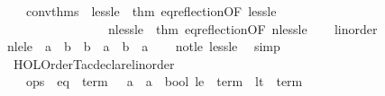 \begin{isabellebody}
\ \ \ \ conv{\isacharunderscore}{\kern0pt}thms\ {\isacharequal}{\kern0pt}\ {\isacharbraceleft}{\kern0pt}less{\isacharunderscore}{\kern0pt}le\ {\isacharequal}{\kern0pt}\ {\isacharat}{\kern0pt}{\isacharbraceleft}{\kern0pt}thm\ eq{\isacharunderscore}{\kern0pt}reflection{\isacharbrackleft}{\kern0pt}OF\ less{\isacharunderscore}{\kern0pt}le{\isacharbrackright}{\kern0pt}{\isacharbraceright}{\kern0pt}{\isacharcomma}{\kern0pt}\isanewline
\ \ \ \ \ \ \ \ \ \ \ \ \ \ \ \ \ nless{\isacharunderscore}{\kern0pt}le\ {\isacharequal}{\kern0pt}\ {\isacharat}{\kern0pt}{\isacharbraceleft}{\kern0pt}thm\ eq{\isacharunderscore}{\kern0pt}reflection{\isacharbrackleft}{\kern0pt}OF\ nless{\isacharunderscore}{\kern0pt}le{\isacharbrackright}{\kern0pt}{\isacharbraceright}{\kern0pt}{\isacharbraceright}{\kern0pt}\isanewline
\ \ {\isacharbraceright}{\kern0pt}\isanewline
{\isacartoucheclose}%
\endisatagML
{\isafoldML}%
%
\isadelimML
\isanewline
%
\endisadelimML
\isanewline
{}\isamarkupfalse%
\isanewline
\isanewline
{}\isamarkupfalse%
\ linorder\isanewline
{}\isanewline
\isanewline
{}\isamarkupfalse%
\ nle{\isacharunderscore}{\kern0pt}le{\isacharcolon}{\kern0pt}\ {\isachardoublequoteopen}{\isacharparenleft}{\kern0pt}{\isasymnot}\ a\ {\isasymle}\ b{\isacharparenright}{\kern0pt}\ {\isasymlongleftrightarrow}\ b\ {\isasymle}\ a\ {\isasymand}\ b\ {\isasymnoteq}\ a{\isachardoublequoteclose}\isanewline
%
\isadelimproof
\ \ %
\endisadelimproof
%
\isatagproof
{}\isamarkupfalse%
\ not{\isacharunderscore}{\kern0pt}le\ less{\isacharunderscore}{\kern0pt}le\ \isamarkupfalse%
\ simp%
\endisatagproof
{\isafoldproof}%
%
\isadelimproof
\isanewline
%
\endisadelimproof
%
\isadelimML
\isanewline
%
\endisadelimML
%
\isatagML
{}\isamarkupfalse%
\ {\isacartoucheopen}\isanewline
\ \ HOL{\isacharunderscore}{\kern0pt}Order{\isacharunderscore}{\kern0pt}Tac{\isachardot}{\kern0pt}declare{\isacharunderscore}{\kern0pt}linorder\ {\isacharbraceleft}{\kern0pt}\isanewline
\ \ \ \ ops\ {\isacharequal}{\kern0pt}\ {\isacharbraceleft}{\kern0pt}eq\ {\isacharequal}{\kern0pt}\ {\isacharat}{\kern0pt}{\isacharbraceleft}{\kern0pt}term\ {\isasymopen}{\isacharparenleft}{\kern0pt}{\isacharequal}{\kern0pt}{\isacharparenright}{\kern0pt}\ {\isacharcolon}{\kern0pt}{\isacharcolon}{\kern0pt}\ {\isacharprime}{\kern0pt}a\ {\isasymRightarrow}\ {\isacharprime}{\kern0pt}a\ {\isasymRightarrow}\ bool{\isasymclose}{\isacharbraceright}{\kern0pt}{\isacharcomma}{\kern0pt}\ le\ {\isacharequal}{\kern0pt}\ {\isacharat}{\kern0pt}{\isacharbraceleft}{\kern0pt}term\ {\isasymopen}{\isacharparenleft}{\kern0pt}{\isasymle}{\isacharparenright}{\kern0pt}{\isasymclose}{\isacharbraceright}{\kern0pt}{\isacharcomma}{\kern0pt}\ lt\ {\isacharequal}{\kern0pt}\ {\isacharat}{\kern0pt}{\isacharbraceleft}{\kern0pt}term\ {\isasymopen}{\isacharparenleft}{\kern0pt}{\isacharless}{\kern0pt}{\isacharparenright}{\kern0pt}{\isasymclose}{\isacharbraceright}{\kern0pt}{\isacharbraceright}{\kern0pt}{\isacharcomma}{\kern0pt}\isanewline

\end{isabellebody}
